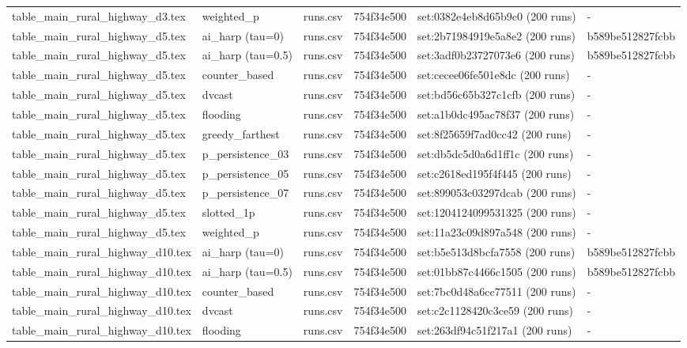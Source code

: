 \begin{tabular}{llllll}
table\_main\_rural\_highway\_d3.tex & weighted\_p & runs.csv & 754f34e500 & set:0382e4eb8d65b9c0 (200 runs) & - \\
table\_main\_rural\_highway\_d5.tex & ai\_harp (tau=0) & runs.csv & 754f34e500 & set:2b71984919e5a8e2 (200 runs) & b589be512827fcbb \\
table\_main\_rural\_highway\_d5.tex & ai\_harp (tau=0.5) & runs.csv & 754f34e500 & set:3adf0b23727073e6 (200 runs) & b589be512827fcbb \\
table\_main\_rural\_highway\_d5.tex & counter\_based & runs.csv & 754f34e500 & set:cecee06fe501e8dc (200 runs) & - \\
table\_main\_rural\_highway\_d5.tex & dvcast & runs.csv & 754f34e500 & set:bd56c65b327c1cfb (200 runs) & - \\
table\_main\_rural\_highway\_d5.tex & flooding & runs.csv & 754f34e500 & set:a1b0dc495ac78f37 (200 runs) & - \\
table\_main\_rural\_highway\_d5.tex & greedy\_farthest & runs.csv & 754f34e500 & set:8f25659f7ad0cc42 (200 runs) & - \\
table\_main\_rural\_highway\_d5.tex & p\_persistence\_03 & runs.csv & 754f34e500 & set:db5dc5d0a6d1ff1c (200 runs) & - \\
table\_main\_rural\_highway\_d5.tex & p\_persistence\_05 & runs.csv & 754f34e500 & set:c2618ed195f4f445 (200 runs) & - \\
table\_main\_rural\_highway\_d5.tex & p\_persistence\_07 & runs.csv & 754f34e500 & set:899053c03297dcab (200 runs) & - \\
table\_main\_rural\_highway\_d5.tex & slotted\_1p & runs.csv & 754f34e500 & set:1204124099531325 (200 runs) & - \\
table\_main\_rural\_highway\_d5.tex & weighted\_p & runs.csv & 754f34e500 & set:11a23c09d897a548 (200 runs) & - \\
table\_main\_rural\_highway\_d10.tex & ai\_harp (tau=0) & runs.csv & 754f34e500 & set:b5e513d8bcfa7558 (200 runs) & b589be512827fcbb \\
table\_main\_rural\_highway\_d10.tex & ai\_harp (tau=0.5) & runs.csv & 754f34e500 & set:01bb87c4466c1505 (200 runs) & b589be512827fcbb \\
table\_main\_rural\_highway\_d10.tex & counter\_based & runs.csv & 754f34e500 & set:7bc0d48a6cc77511 (200 runs) & - \\
table\_main\_rural\_highway\_d10.tex & dvcast & runs.csv & 754f34e500 & set:c2c1128420c3ce59 (200 runs) & - \\
table\_main\_rural\_highway\_d10.tex & flooding & runs.csv & 754f34e500 & set:263df94c51f217a1 (200 runs) & - \\

\end{tabular}
